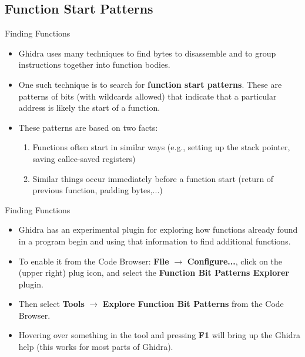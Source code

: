 \documentclass{beamer}
\begin{document}
\subsection{Function Start Patterns}

\begin{frame}
\begin{block}{Finding Functions}
\begin{itemize}
\item Ghidra uses many techniques to find bytes to disassemble and to group instructions together into function bodies.
\item One such technique is to search for \textbf{function start patterns}.  These are patterns of bits (with wildcards allowed) that indicate that a particular address is likely the
start of a function.
\item These patterns are based on two facts:
\begin{enumerate}
\item Functions often start in similar ways (e.g., setting up the stack pointer, saving callee-saved registers)
\item Similar things occur immediately before a function start (return of previous function, padding bytes,...)
\end{enumerate}
\end{itemize}
\end{block}
\end{frame}

\begin{frame}
\begin{block}{Finding Functions}
\begin{itemize}
\item Ghidra has an experimental plugin for exploring how functions already found in a program begin and using that information to find additional functions.
\item To enable it from the Code Browser: \textbf{File} $\rightarrow$ \textbf{Configure...}, click on the (upper right) plug icon, and select the 
\textbf{Function Bit Patterns Explorer} plugin.
\item Then select \textbf{Tools} $\rightarrow$ \textbf{Explore Function Bit Patterns} from the Code Browser.
\item Hovering over something in the tool and pressing \textbf{F1} will bring up the Ghidra help (this works for most parts of Ghidra).
\end{itemize}
\end{block}
\end{frame}
\end{document}
